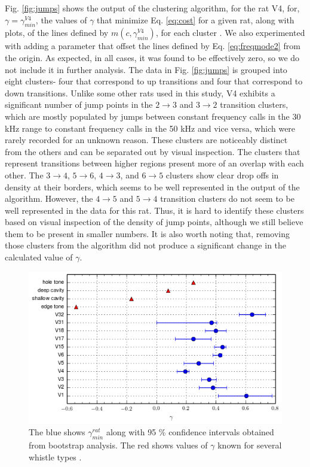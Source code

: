 \documentclass[superscriptaddress, twocolumn, prl]{revtex4}
\begin{document}
Fig. \ref{fig:jumps} shows the output of the clustering algorithm, for the rat V4, for, $\gamma=\gamma_{min}^{V4}$, the values of $\gamma$ that minimize Eq. \ref{eq:cost} for a given rat, along with plots, of the lines defined by $m\left(c,\gamma_{min}^{V4}\right)$, for each cluster \cite{jump_appendix}. We also experimented with adding a parameter that offset the lines defined by Eq. \ref{eq:freqmode2} from the origin. As expected, in all cases, it was found to be effectively zero, so we do not include it in further analysis. The data in Fig. \ref{fig:jumps} is grouped into eight clusters- four that correspond to up transitions and four that correspond to down transitions. Unlike some other rats used in this study, V4 exhibits a significant number of jump points in the $2\rightarrow3$ and $3\rightarrow2$ transition clusters, which are mostly populated by jumps between constant frequency calls in the 30 kHz range to constant frequency calls in the 50 kHz and vice versa, which were rarely recorded for an unknown reason. These clusters are noticeably distinct from the others and can be separated out by visual inspection. The clusters that represent transitions between higher regions present more of an overlap with each other. The $3\rightarrow4$, $5\rightarrow6$, $4\rightarrow3$, and $6\rightarrow5$ clusters show clear drop offs in density at their borders, which seems to be well represented in the output of the algorithm. However, the $4\rightarrow5$ and $5\rightarrow4$ transition clusters do not seem to be well represented in the data for this rat. Thus, it is hard to identify these clusters based on visual inspection of the density of jump points, although we still believe them to be present in smaller numbers. It is also worth noting that, removing those clusters from the algorithm did not produce a significant change in the calculated value of $\gamma$. 
\begin{figure}[!ht]
\centering
\includegraphics[width=\columnwidth]{gamma_error.png}
\caption{\label{fig:gamma_error} The blue shows $\gamma_{min}^{rat}$ along with 95 \% confidence intervals obtained from bootstrap analysis. The red shows values of $\gamma$ known for several whistle types \cite{Howe2008}.}
\end{figure}
\end{document}
